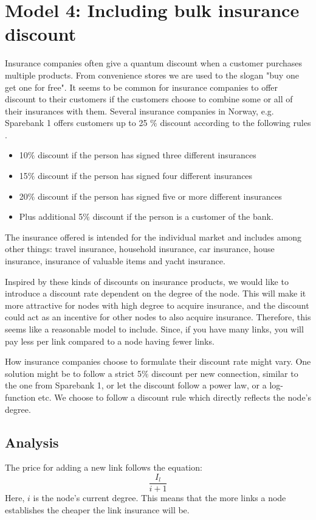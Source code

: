 \section{Model 4: Including bulk insurance discount}

Insurance companies often give a quantum discount when a customer purchases multiple products. From convenience stores we are used to the slogan "buy one get one for free". It seems to be common for insurance companies to offer discount to their customers if the customers choose to combine some or all of their insurances with them. Several insurance companies in Norway, e.g. Sparebank 1 offers customers up to 25 $\%$ discount according to the following rules \cite{sparebank1}. 

\begin{itemize}

\item 10$\%$ discount if the person has signed three different insurances
\item 15$\%$ discount if the person has signed four different insurances
\item 20$\%$ discount if the person has signed five or more different insurances
\item Plus additional 5$\%$ discount if the person is a customer of the bank. 

\end{itemize}

The insurance offered is intended for the individual market and includes among other things: travel insurance, household insurance, car insurance, house insurance, insurance of valuable items and yacht insurance.

Inspired by these kinds of discounts on insurance products, we would like to introduce a discount rate dependent on the degree of the node. This will make it more attractive for nodes with high degree to acquire insurance, and the discount could act as an incentive for other nodes to also acquire insurance. Therefore, this seems like a reasonable model to include. Since, if you have many links, you will pay less per link compared to a node having fewer links.

How insurance companies choose to formulate their discount rate might vary. One solution might be to follow a strict 5$\%$ discount per new connection, similar to the one from Sparebank 1, or let the discount follow a power law, or a log-function etc. We choose to follow a discount rule which directly reflects the node's degree.
\subsection{Analysis}
The price for adding a new link follows the equation:
\begin{equation}
\frac{I_{l}}{i+1}
\label{eq:discount0}
\end{equation}
Here, $i$ is the node's current degree. This means that the more links a node establishes the cheaper the link insurance will be. 

